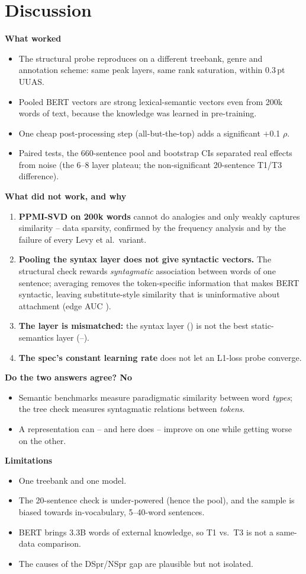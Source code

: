 \documentclass[11pt,a4paper]{article}
\newcommand{\pt}{\,pt}
\newcommand{\blk}[1]{\par\needspace{5\baselineskip}\smallskip\noindent\textbf{#1}\par\nobreak\vspace{1pt}}
\begin{document}
\section{Discussion}\label{sec:disc}
\blk{What worked}
\begin{itemize}
\item The structural probe reproduces on a different treebank, genre and annotation scheme: same peak layers, same rank saturation,
within 0.3\pt{} UUAS.
\item Pooled BERT vectors are strong lexical-semantic vectors even from 200k words of text, because the knowledge was learned in pre-training.
\item One cheap post-processing step (all-but-the-top) adds a significant $+$0.1 $\rho$.
\item Paired tests, the 660-sentence pool and bootstrap CIs separated real effects from noise (the 6--8 layer plateau; the
non-significant 20-sentence T1/T3 difference).
\end{itemize}
\blk{What did not work, and why}
\begin{enumerate}
\item \textbf{PPMI-SVD on 200k words} cannot do analogies and only weakly captures similarity -- data sparsity, confirmed by the
frequency analysis and by the failure of every Levy et al.\ variant.
\item \textbf{Pooling the syntax layer does not give syntactic vectors.} The structural check rewards \emph{syntagmatic} association
between words of one sentence; averaging removes the token-specific information that makes BERT syntactic, leaving substitute-style
similarity that is uninformative about attachment (edge AUC \AucTThree).
\item \textbf{The layer is mismatched:} the syntax layer (\Lstar) is not the best static-semantics layer (\BestSemLayer--\BestAnLayer).
\item \textbf{The spec's constant learning rate} does not let an L1-loss probe converge.
\end{enumerate}
\blk{Do the two answers agree? No}
\begin{itemize}
\item Semantic benchmarks measure paradigmatic similarity between word \emph{types}; the tree check measures syntagmatic relations
between \emph{tokens}.
\item A representation can -- and here does -- improve on one while getting worse on the other.
\end{itemize}
\blk{Limitations}
\begin{itemize}
\item One treebank and one model.
\item The 20-sentence check is under-powered (hence the pool), and the sample is biased towards in-vocabulary, 5--40-word sentences.
\item BERT brings 3.3B words of external knowledge, so T1 vs.\ T3 is not a same-data comparison.
\item The causes of the DSpr/NSpr gap are plausible but not isolated.
\end{itemize}
\end{document}

